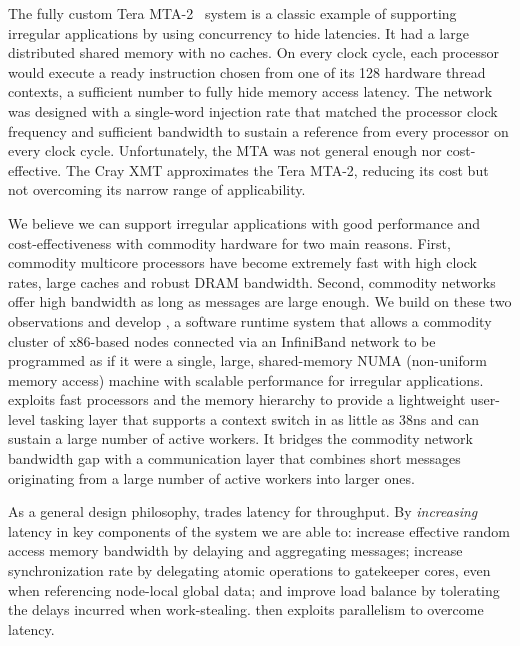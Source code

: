 The fully custom Tera MTA-2~\cite{tera:mta1} system is a classic example of
supporting irregular applications by using concurrency to hide latencies. It
had a large distributed shared memory with no caches. On every clock cycle,
each processor would execute a ready instruction chosen from one of its 128
hardware thread contexts, a sufficient number to fully hide memory access
latency. The network was designed with a single-word injection rate that
matched the processor clock frequency and sufficient bandwidth to sustain a
reference from every processor on every clock cycle. Unfortunately, the MTA
was not general enough nor cost-effective. The Cray XMT approximates the Tera
MTA-2, reducing its cost but not overcoming its narrow range of applicability.

We believe we can support irregular applications with good performance and cost-effectiveness with commodity hardware for two main reasons. First, commodity multicore processors have become extremely fast with high clock rates, large caches and robust DRAM bandwidth. Second, commodity networks offer high bandwidth as long as messages are large enough. We build on these two observations and develop \Grappa, a software runtime system that allows a commodity cluster of x86-based nodes connected via an InfiniBand network to be programmed as if it were a single, large, shared-memory NUMA (non-uniform memory access) machine with scalable performance for irregular applications. \Grappa exploits fast processors and the memory hierarchy to provide a lightweight user-level tasking layer that supports a context switch in as little as 38ns and can sustain a large number of active workers. It bridges the commodity network bandwidth gap with a communication layer that combines short messages originating from a large number of active workers into larger ones.

As a general design philosophy, \Grappa trades latency for throughput.  By \emph{increasing} latency in key components of the system we are able to: increase effective random access memory bandwidth by delaying and aggregating messages; increase synchronization rate by delegating atomic operations to gatekeeper cores, even when referencing node-local global data; and improve load balance by tolerating the delays incurred when work-stealing.  \Grappa then exploits parallelism to overcome latency.

